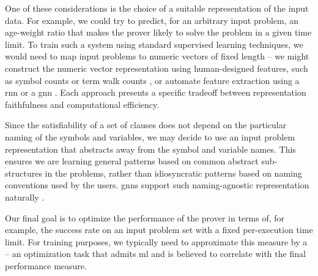 
One of these considerations is the choice of a suitable representation of the input data.
For example, we could try to predict, for an arbitrary input problem, an age-weight ratio
that makes the prover likely to solve the problem in a given time limit.
To train such a system using standard supervised learning techniques,
we would need to map input problems to numeric vectors of fixed length --
we might construct the numeric vector representation using human-designed features,
such as symbol counts or term walk counts \cite{DBLP:conf/mkm/JakubuvU17},
or automate feature extraction using a \gls{rnn} \cite{DBLP:conf/cade/ChvalovskyJ0U19,DBLP:conf/iclr/EvansSAKG18} or a \gls{gnn} \cite{DBLP:conf/cade/JakubuvCOP0U20}.
Each approach presents a specific tradeoff between representation faithfulness and computational efficiency.

Since the satisfiability of a set of clauses does not depend on the particular naming of the symbols and variables,
we may decide to use an input problem representation that abstracts away from the symbol and variable names.
This ensures we are learning general patterns based on common abstract sub-structures in the problems,
rather than idiosyncratic patterns based on naming conventions used by the users.
\Glspl{gnn} support such naming-agnostic representation naturally \cite{DBLP:conf/cade/JakubuvCOP0U20}.

Our final goal is to optimize the performance of the prover in terms of, for example, the success rate on an input problem set with a fixed per-execution time limit.
For training purposes,
we typically need to approximate this measure by a  -- an optimization task that admits \gls{ml} and is believed to correlate with the final performance measure.

